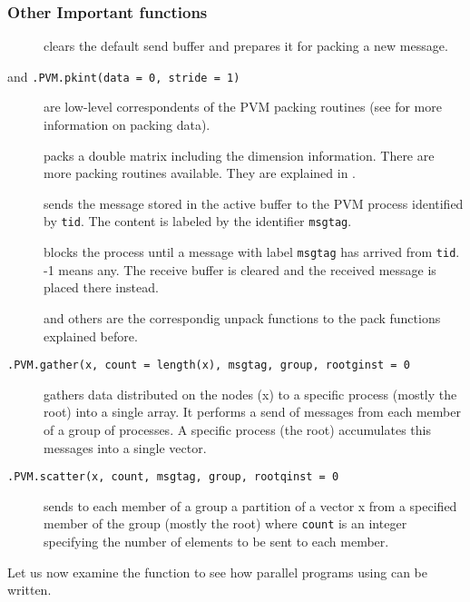 \subsubsection{Other Important functions}
\begin{description}
\item[] clears the default send buffer and
  prepares it for packing a new message.
\item[ and \texttt{.PVM.pkint(data =
    0, stride = 1)}] are low-level correspondents of the PVM packing
    routines (see \cite{geist94pvm} for more information on packing
    data). 
\item[] packs a double matrix including
  the dimension information. There are more packing routines
  available. They are explained in \cite{nali07rpvm}.
\item[] sends the message stored in the
  active buffer to the PVM process identified by \texttt{tid}. The
  content is labeled by the identifier \texttt{msgtag}.
\item[] blocks the process
  until a message with label \texttt{msgtag} has arrived from
  \texttt{tid}. -1 means any. The receive buffer is cleared
  and the received message is placed there instead.
\item[] and
  others are the correspondig unpack functions to the
  pack functions explained before.
\item[\texttt{.PVM.gather(x, count = length(x), msgtag, group,
    rootginst = 0}] gathers data distributed on the nodes (x) to a
  specific process (mostly the root) into a single array. It performs
  a send of messages from each member of a group of processes. A
  specific process (the root) accumulates this messages into a single
  vector. 
\item[\texttt{.PVM.scatter(x, count, msgtag, group, rootqinst = 0}]
  sends to each member of a group a partition of  a vector x from a
  specified member of the group (mostly the root) where \texttt{count}
  is an integer specifying the number of elements to be sent to each
  member. 
\end{description}

Let us now examine the function to see how parallel programs using
 can be written.

